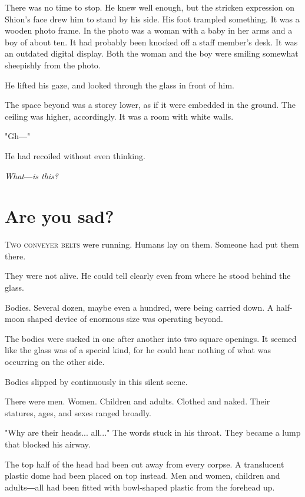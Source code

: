 There was no time to stop. He knew well enough, but the stricken
expression on Shion's face drew him to stand by his side. His foot
trampled something. It was a wooden photo frame. In the photo was a
woman with a baby in her arms and a boy of about ten. It had probably
been knocked off a staff member's desk. It was an outdated digital
display. Both the woman and the boy were smiling somewhat sheepishly
from the photo.

He lifted his gaze, and looked through the glass in front of him.

The space beyond was a storey lower, as if it were embedded in the
ground. The ceiling was higher, accordingly. It was a room with white
walls.

"Gh―"

He had recoiled without even thinking.

\emph{What―is this?}

\chapter{Are you sad?}


\lettrine{T}{wo conveyer belts} were running. Humans lay on them. Someone had put
them there.

They were not alive. He could tell clearly even from where he stood
behind the glass.

Bodies. Several dozen, maybe even a hundred, were being carried down. A
half-moon shaped device of enormous size was operating beyond.

The bodies were sucked in one after another into two square openings. It
seemed like the glass was of a special kind, for he could hear nothing
of what was occurring on the other side.

Bodies slipped by continuously in this silent scene.

There were men. Women. Children and adults. Clothed and naked. Their
statures, ages, and sexes ranged broadly.

"Why are their heads... all..." The words stuck in his throat. They
became a lump that blocked his airway.

The top half of the head had been cut away from every corpse. A
translucent plastic dome had been placed on top instead. Men and women,
children and adults―all had been fitted with bowl-shaped plastic from
the forehead up.

